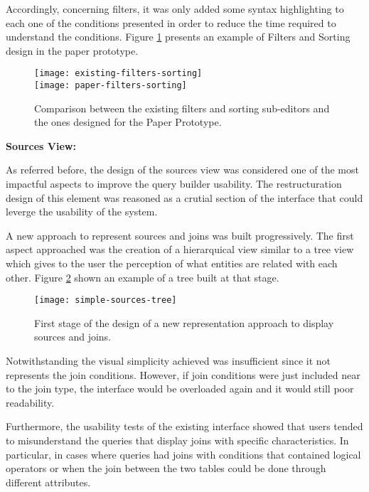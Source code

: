 Accordingly, concerning filters, it was only added some syntax highlighting to each one of the conditions presented in order to reduce the time required to understand the conditions. Figure \ref{fig:filtersAndSortingComparison} presents an example of Filters and Sorting design in the paper prototype.

\begin{figure}[tb]
  \centering
    {\texttt{[image: existing-filters-sorting]}}%
    \\
  {\texttt{[image: paper-filters-sorting]}}%
\caption{Comparison between the existing filters and sorting sub-editors and the ones designed for the Paper Prototype.}
  \label{fig:filtersAndSortingComparison}
\end{figure}

\medskip

\textbf{Sources View: }

\medskip

As referred before, the design of the sources view was considered one of the most impactful aspects to improve the query builder usability. The restructuration design of this element was reasoned as a crutial section of the interface that could leverge the usability of the system. 

A new approach to represent sources and joins was built progressively. The first aspect approached was the creation of a hierarquical view similar to a tree view which gives to the user the perception of what entities are related with each other. Figure \ref{fig:simpleSourcesTree} shown an example of a tree built at that stage.

\begin{figure}[htbp]
	\centering
	\texttt{[image: simple-sources-tree]}
	\caption{First stage of the design of a new representation approach to display sources and joins.}
	\label{fig:simpleSourcesTree}
\end{figure}

Notwithstanding the visual simplicity achieved was insufficient since it not represents the join conditions. However, if join conditions were just included near to the join type, the interface would be overloaded again and it would still poor readability.

Furthermore, the usability tests of the existing interface showed that users tended to misunderstand the queries that display joins with specific characteristics. In particular, in cases where queries had joins with conditions that contained logical operators or when the join between the two tables could be done through different attributes.

